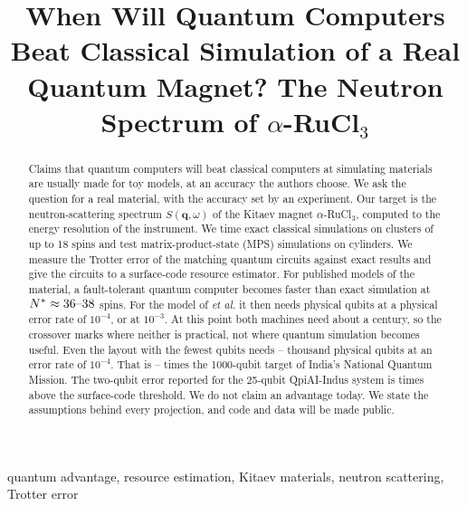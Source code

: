 \documentclass[conference]{IEEEtran}
\newcommand{\RuCl}{$\alpha$-RuCl$_3$}
\begin{document}
\title{When Will Quantum Computers Beat Classical Simulation of a Real Quantum Magnet?
The Neutron Spectrum of \RuCl}


\maketitle

\begin{abstract}
Claims that quantum computers will beat classical computers at simulating
materials are usually made for toy models, at an accuracy the authors
choose. We ask the question for a real material, with the accuracy set by
an experiment. Our target is the neutron-scattering spectrum
$S(\mathbf q,\omega)$ of the Kitaev magnet \RuCl, computed to the energy
resolution of the instrument. We time exact classical simulations on
clusters of up to 18 spins and test matrix-product-state (MPS)
simulations on cylinders. We measure the Trotter error of the matching quantum circuits
against exact results and give the circuits to a surface-code resource
estimator. For \nSets{} published models of the material, a fault-tolerant
quantum computer becomes faster than exact simulation at
$N^*\approx36\text{--}38$ spins. For the model of \mainSet{} \emph{et al.}
it then needs \physQWinterB{} physical qubits at a physical error rate of
$10^{-4}$, or \physQWinterA{} at $10^{-3}$. At this point both machines need
about a century, so the crossover marks where neither is practical, not
where quantum simulation becomes useful. Even the layout with the fewest qubits
needs \indiaMinQloB--\indiaMinQhiB{} thousand physical qubits at an error
rate of $10^{-4}$. That is \indiaMinGapNQMloB--\indiaMinGapNQMhiB{} times
the 1000-qubit target of India's National Quantum Mission. The two-qubit
error reported for the 25-qubit QpiAI-Indus system is
\indiaQpiaiOverThreshold{} times above the surface-code threshold. We do
not claim an advantage today. We state the assumptions behind every
projection, and code and data will be made public.
\end{abstract}

\begin{IEEEkeywords}
quantum advantage, resource estimation, Kitaev materials, neutron scattering, Trotter error
\end{IEEEkeywords}
\end{document}
